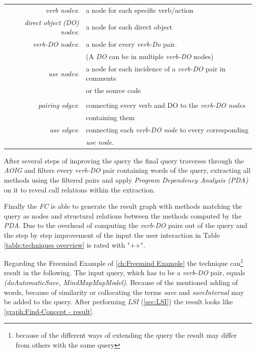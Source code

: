 \begin{table}[th]
	\begin{tabular}{r l}
		\textit{verb nodes}: & a node for each specific verb/action \\
		\textit{direct object (DO) nodes}: & a node for each direct object \\
		\textit{verb-DO nodes}: & a node for every \textit{verb-Do} pair. \\
		&(A \textit{DO} can be in multiple \textit{verb-DO} nodes) \\
		\textit{use nodes}: & a node for each incidence of a \textit{verb-DO} pair in comments \\
		& or the source code \\
		 & \\
		\textit{pairing edges}: & connecting every verb and DO to the \textit{verb-DO nodes} \\
		&containing them \\
		\textit{use edges}: & connecting each \textit{verb-DO node} to every corresponding \\
		& \textit{use node}.
	\end{tabular}
\end{table}

After several steps of improving the query the final query traverses through the \textit{AOIG} and filters every \textit{verb-DO} pair containing words of the query, extracting all methods using the filtered pairs and apply \textit{Program Dependency Analysis (PDA)} on it to reveal call relations within the extraction.

Finally the \emph{FC} is able to generate the result graph with methods matching the query as nodes and structural relations between the methods computed by the \textit{PDA}. \cite{shepherd2007using} \newline
Due to the overhead of computing the \textit{verb-DO} pairs out of the query and the step by step improvement of the input the user interaction in Table \ref{table:techniques overview} is rated with "++".

Regarding the Freemind Example of \autoref{ch:Freemind Example} the technique can\footnote{because of the different ways of extending the query the result may differ from others with the same query} result in the following. The input query, which has to be a \textit{verb-DO} pair, equals \textit{(doAutomaticSave, MindMapMapModel)}. Because of the mentioned adding of words, because of similarity or collocating the terms \textit{save} and \textit{saveInternal} may be added to the query. After performing \textit{LSI} (\autoref{sec:LSI}) the result looks like \autoref{graph:Find-Concept - result}.


